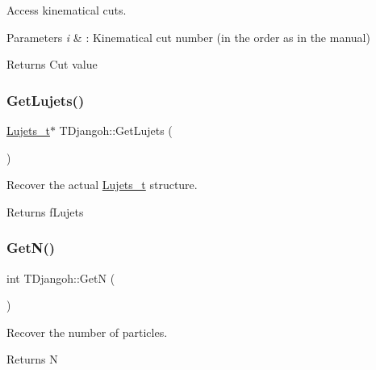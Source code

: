 Access kinematical cuts. 


\begin{DoxyParams}{Parameters}
{\em i} & \+: Kinematical cut number (in the order as in the manual) \\
\hline
\end{DoxyParams}
\begin{DoxyReturn}{Returns}
Cut value 
\end{DoxyReturn}
\mbox{\label{class_t_djangoh_a2572e682379a304f84f21840d488fa0c}} 
\subsubsection{\texorpdfstring{Get\+Lujets()}{GetLujets()}}
{\footnotesize\ttfamily \hyperlink{struct_lujets__t}{Lujets\+\_\+t}$\ast$ T\+Djangoh\+::\+Get\+Lujets (\begin{DoxyParamCaption}{ }\end{DoxyParamCaption})\hspace{0.3cm}{\ttfamily [inline]}}



Recover the actual \hyperlink{struct_lujets__t}{Lujets\+\_\+t} structure. 

\begin{DoxyReturn}{Returns}
f\+Lujets 
\end{DoxyReturn}
\mbox{\label{class_t_djangoh_a501e50bbb1ad6a75014fd7c555313b74}} 
\subsubsection{\texorpdfstring{Get\+N()}{GetN()}}
{\footnotesize\ttfamily int T\+Djangoh\+::\+GetN (\begin{DoxyParamCaption}{ }\end{DoxyParamCaption})\hspace{0.3cm}{\ttfamily [inline]}}



Recover the number of particles. 

\begin{DoxyReturn}{Returns}
N 
\end{DoxyReturn}
\mbox{\label{class_t_djangoh_afb58be11a10e8a6a4b442ea0fe4e16f5}} 
